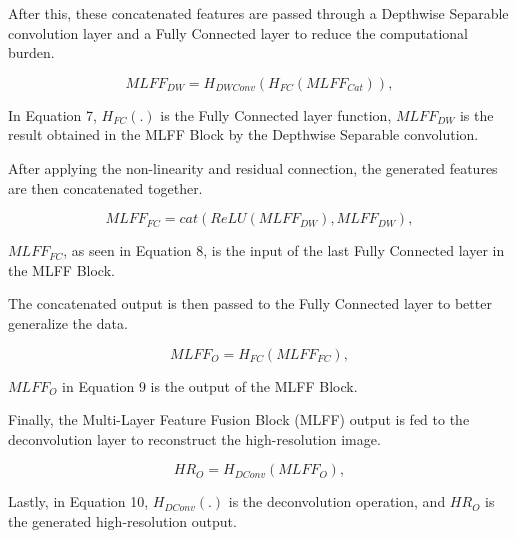 \documentclass[journal]{IEEEtran}
\begin{document}
\vspace{\baselineskip}

After this, these concatenated features are passed through a Depthwise Separable convolution layer and a Fully Connected layer to reduce the computational burden.

\begin{equation}
{MLFF_{DW}}= {H_{DWConv}}({H_{FC}}({MLFF_{Cat}})), \tag{S7}
\end{equation}

In Equation 7, ${H_{FC}}$$(.)$ is the Fully Connected layer function, ${MLFF_{DW}}$ is the result obtained in the MLFF Block by the Depthwise Separable convolution.

\vspace{\baselineskip}

After applying the non-linearity and residual connection, the generated features are then concatenated together. 

\begin{equation}
{MLFF_{FC}}= {cat}({ReLU}({MLFF_{DW}}), {MLFF_{DW}}),  \tag{S8}
\end{equation}

${MLFF_{FC}}$, as seen in Equation 8, is the input of the last Fully Connected layer in the MLFF Block.

\vspace{\baselineskip}

The concatenated output is then passed to the Fully Connected layer to better generalize the data.

\begin{equation}
{MLFF_{O}}= {H_{FC}}({MLFF_{FC}}),  \tag{S9}
\end{equation}

${MLFF_{O}}$ in Equation 9 is the output of the MLFF Block.



Finally, the Multi-Layer Feature Fusion Block (MLFF) output is fed to the deconvolution layer to reconstruct the high-resolution image.

\begin{equation}
{HR_{O}}= {H_{DConv}}({MLFF_{O}}), \tag{S10}
\end{equation}

Lastly, in Equation 10, ${H_{DConv}}$$(.)$ is the deconvolution operation, and ${HR_{O}}$ is the generated high-resolution output.

\vspace{-\baselineskip}
\end{document}
